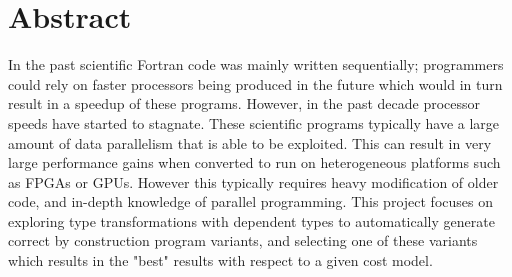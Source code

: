 \section{Abstract}
In the past scientific Fortran code was mainly written sequentially; programmers 
could rely on faster processors being produced in the future which would in turn result in a 
speedup of these programs. However, in the past decade processor speeds have started
to stagnate. These scientific programs typically have a large amount of data parallelism that is 
able to be exploited. This can result in very large performance gains when converted to run 
on heterogeneous platforms such as FPGAs or GPUs. However this typically requires heavy modification of older code, 
and in-depth knowledge of parallel programming. This project focuses on exploring type transformations with 
dependent types to automatically generate correct by construction program variants, and selecting
one of these variants which results in the "best" results with respect to a given cost model.
